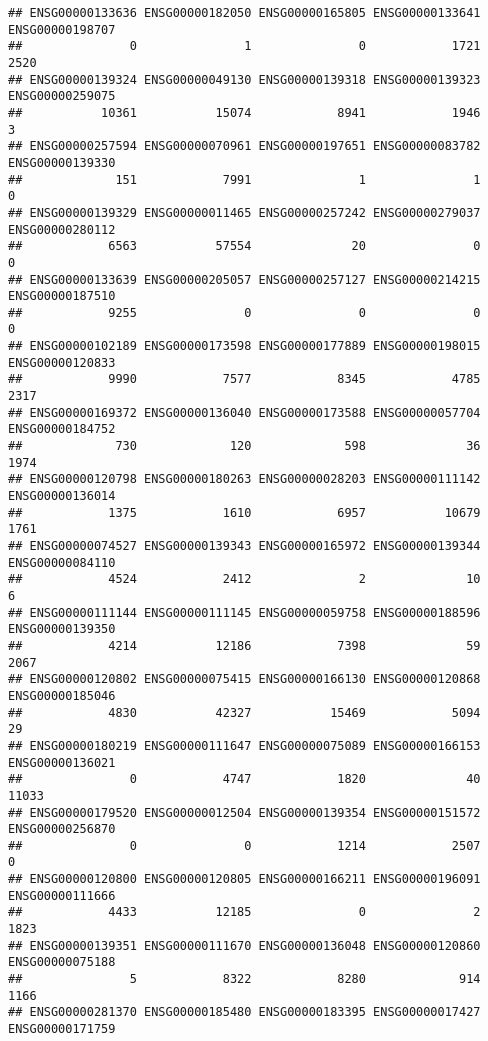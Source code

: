 \documentclass[
]{article}
\begin{document}
\begin{verbatim}
## ENSG00000133636 ENSG00000182050 ENSG00000165805 ENSG00000133641 ENSG00000198707 
##               0               1               0            1721            2520 
## ENSG00000139324 ENSG00000049130 ENSG00000139318 ENSG00000139323 ENSG00000259075 
##           10361           15074            8941            1946               3 
## ENSG00000257594 ENSG00000070961 ENSG00000197651 ENSG00000083782 ENSG00000139330 
##             151            7991               1               1               0 
## ENSG00000139329 ENSG00000011465 ENSG00000257242 ENSG00000279037 ENSG00000280112 
##            6563           57554              20               0               0 
## ENSG00000133639 ENSG00000205057 ENSG00000257127 ENSG00000214215 ENSG00000187510 
##            9255               0               0               0               0 
## ENSG00000102189 ENSG00000173598 ENSG00000177889 ENSG00000198015 ENSG00000120833 
##            9990            7577            8345            4785            2317 
## ENSG00000169372 ENSG00000136040 ENSG00000173588 ENSG00000057704 ENSG00000184752 
##             730             120             598              36            1974 
## ENSG00000120798 ENSG00000180263 ENSG00000028203 ENSG00000111142 ENSG00000136014 
##            1375            1610            6957           10679            1761 
## ENSG00000074527 ENSG00000139343 ENSG00000165972 ENSG00000139344 ENSG00000084110 
##            4524            2412               2              10               6 
## ENSG00000111144 ENSG00000111145 ENSG00000059758 ENSG00000188596 ENSG00000139350 
##            4214           12186            7398              59            2067 
## ENSG00000120802 ENSG00000075415 ENSG00000166130 ENSG00000120868 ENSG00000185046 
##            4830           42327           15469            5094              29 
## ENSG00000180219 ENSG00000111647 ENSG00000075089 ENSG00000166153 ENSG00000136021 
##               0            4747            1820              40           11033 
## ENSG00000179520 ENSG00000012504 ENSG00000139354 ENSG00000151572 ENSG00000256870 
##               0               0            1214            2507               0 
## ENSG00000120800 ENSG00000120805 ENSG00000166211 ENSG00000196091 ENSG00000111666 
##            4433           12185               0               2            1823 
## ENSG00000139351 ENSG00000111670 ENSG00000136048 ENSG00000120860 ENSG00000075188 
##               5            8322            8280             914            1166 
## ENSG00000281370 ENSG00000185480 ENSG00000183395 ENSG00000017427 ENSG00000171759 

\end{verbatim}
\end{document}
